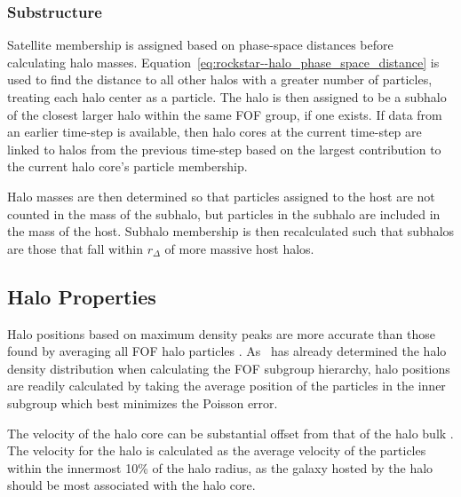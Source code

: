 \subsubsection{Substructure}
\label{subsubsec:rockstar--halo_finding--substructure}


Satellite membership is assigned based on phase-space distances before calculating halo masses.  Equation~\ref{eq:rockstar--halo_phase_space_distance} is used to find the distance to all other halos with a greater number of particles, treating each halo center as a particle.  The halo is then assigned to be a subhalo of the closest larger halo within the same FOF group, if one exists.  If data from an earlier time-step is available, then halo cores at the current time-step are linked to halos from the previous time-step based on the largest contribution to the current halo core's particle membership.

Halo masses are then determined so that particles assigned to the host are not counted in the mass of the subhalo, but particles in the subhalo are included in the mass of the host.  Subhalo membership is then recalculated such that subhalos are those that fall within $r_{\Delta}$ of more massive host halos.




\subsection{Halo Properties}
\label{subsec:rockstar--halo_properties}


Halo positions based on maximum density peaks are more accurate than those found by averaging all FOF halo particles \cn.  As \rockstar\ has already determined the halo density distribution when calculating the FOF subgroup hierarchy, halo positions are readily calculated by taking the average position of the particles in the inner subgroup which best minimizes the Poisson error.

The velocity of the halo core can be substantial offset from that of the halo bulk \cn.  The velocity for the halo is calculated as the average velocity of the particles within the innermost 10\% of the halo radius, as the galaxy hosted by the halo should be most associated with the halo core.

